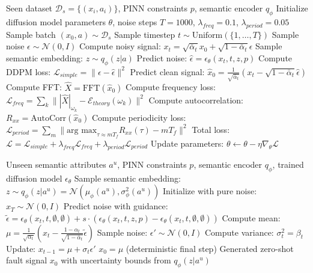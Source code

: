 \begin{algorithm}[h]
\caption{PC-Diffusion Training}
\label{alg:train}
\begin{algorithmic}[1]
\REQUIRE Seen dataset $\mathcal{D}_s = \{(x_i, a_i)\}$, PINN constraints $p$, semantic encoder $q_\phi$
\STATE Initialize diffusion model parameters $\theta$, noise steps $T=1000$, $\lambda_{freq}=0.1$, $\lambda_{period}=0.05$
\REPEAT
    \STATE Sample batch $(x_0, a) \sim \mathcal{D}_s$
    \STATE Sample timestep $t \sim \text{Uniform}(\{1, \dots, T\})$
    \STATE Sample noise $\epsilon \sim \mathcal{N}(0, I)$
    \STATE Compute noisy signal: $x_t = \sqrt{\bar{\alpha}_t}x_0 + \sqrt{1-\bar{\alpha}_t}\epsilon$
    \STATE Sample semantic embedding: $z \sim q_\phi(z|a)$
    \STATE Predict noise: $\hat{\epsilon} = \epsilon_\theta(x_t, t, z, p)$
    \STATE Compute DDPM loss: $\mathcal{L}_{simple} = \| \epsilon - \hat{\epsilon} \|^2$
    \STATE Predict clean signal: $\hat{x}_0 = \frac{1}{\sqrt{\bar{\alpha}_t}}(x_t - \sqrt{1-\bar{\alpha}_t}\hat{\epsilon})$
    \STATE Compute FFT: $\hat{X} = \text{FFT}(\hat{x}_0)$
    \STATE Compute frequency loss: $\mathcal{L}_{freq} = \sum_k \||\hat{X}|_{\omega_k} - \mathcal{E}_{theory}(\omega_k)\|^2$
    \STATE Compute autocorrelation: $R_{xx} = \text{AutoCorr}(\hat{x}_0)$
    \STATE Compute periodicity loss: $\mathcal{L}_{period} = \sum_m \|\text{arg max}_{\tau \approx m T_f} R_{xx}(\tau) - m T_f\|^2$
    \STATE Total loss: $\mathcal{L} = \mathcal{L}_{simple} + \lambda_{freq} \mathcal{L}_{freq} + \lambda_{period} \mathcal{L}_{period}$
    \STATE Update parameters: $\theta \leftarrow \theta - \eta \nabla_\theta \mathcal{L}$
\end{algorithmic}
\end{algorithm}

\begin{algorithm}[h]
\caption{Zero-Shot Inference with PC-Diffusion}
\label{alg:infer}
\begin{algorithmic}[1]
\REQUIRE Unseen semantic attributes $a^u$, PINN constraints $p$, semantic encoder $q_\phi$, trained diffusion model $\epsilon_\theta$
\STATE Sample semantic embedding: $z \sim q_\phi(z|a^u) = \mathcal{N}(\mu_\phi(a^u), \sigma_\phi^2(a^u))$
\STATE Initialize with pure noise: $x_T \sim \mathcal{N}(0, I)$
    \STATE Predict noise with guidance: $\tilde{\epsilon} = \epsilon_\theta(x_t, t, \emptyset, \emptyset) + s \cdot (\epsilon_\theta(x_t, t, z, p) - \epsilon_\theta(x_t, t, \emptyset, \emptyset))$
    \STATE Compute mean: $\mu = \frac{1}{\sqrt{\alpha_t}} \left( x_t - \frac{1-\alpha_t}{\sqrt{1-\bar{\alpha}_t}} \tilde{\epsilon} \right)$
        \STATE Sample noise: $\epsilon' \sim \mathcal{N}(0, I)$
        \STATE Compute variance: $\sigma_t^2 = \beta_t$
        \STATE Update: $x_{t-1} = \mu + \sigma_t \epsilon'$
    \ELSE
        \STATE $x_0 = \mu$ (deterministic final step)
    \ENDIF
\ENDFOR
\RETURN Generated zero-shot fault signal $x_0$ with uncertainty bounds from $q_\phi(z|a^u)$
\end{algorithmic}
\end{algorithm}

